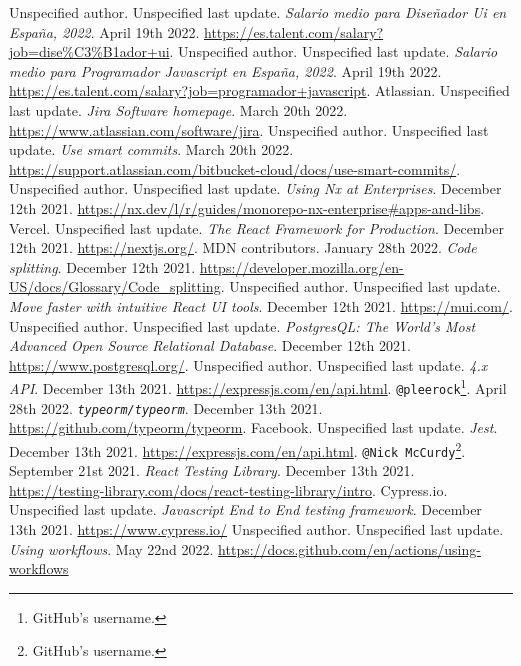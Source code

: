 \documentclass[a4paper, 12pt, oneside]{book}
\begin{document}
\begin{thebibliography}{9}
	Unspecified author. Unspecified last update. \emph{Salario medio para Diseñador Ui en España, 2022}. April 19th 2022. \url{https://es.talent.com/salary?job=dise%C3%B1ador+ui}.
	Unspecified author. Unspecified last update. \emph{Salario medio para Programador Javascript en España, 2022}. April 19th 2022. \url{https://es.talent.com/salary?job=programador+javascript}.
	Atlassian. Unspecified last update. \emph{Jira Software homepage}. March 20th 2022. \url{https://www.atlassian.com/software/jira}.
	Unspecified author. Unspecified last update. \emph{Use smart commits}. March 20th 2022. \url{https://support.atlassian.com/bitbucket-cloud/docs/use-smart-commits/}.
	Unspecified author. Unspecified last update. \emph{Using Nx at Enterprises}. December 12th 2021. \url{https://nx.dev/l/r/guides/monorepo-nx-enterprise#apps-and-libs}.
	Vercel. Unspecified last update. \emph{The React Framework for Production}. December 12th 2021. \url{https://nextjs.org/}.
	MDN contributors. January 28th 2022. \emph{Code splitting}. December 12th 2021. \url{https://developer.mozilla.org/en-US/docs/Glossary/Code_splitting}.
	Unspecified author. Unspecified last update. \emph{Move faster with intuitive React UI tools}. December 12th 2021. \url{https://mui.com/}.
	Unspecified author. Unspecified last update. \emph{PostgresQL: The World's Most Advanced Open Source Relational Database}. December 12th 2021. \url{https://www.postgresql.org/}.
	Unspecified author. Unspecified last update. \emph{4.x API}. December 13th 2021. \url{https://expressjs.com/en/api.html}.
	\texttt{@pleerock}\footnote{GitHub's username.}. April 28th 2022. \emph{\texttt{typeorm/typeorm}}. December 13th 2021. \url{https://github.com/typeorm/typeorm}.
	Facebook. Unspecified last update. \emph{Jest}. December 13th 2021. \url{https://expressjs.com/en/api.html}.
	\texttt{@Nick McCurdy}\footnote{GitHub's username.}. September 21st 2021. \emph{React Testing Library}. December 13th 2021. \url{https://testing-library.com/docs/react-testing-library/intro}.
	Cypress.io. Unspecified last update. \emph{Javascript End to End testing framework}. December 13th 2021. \url{https://www.cypress.io/}
	Unspecified author. Unspecified last update. \emph{Using workflows}. May 22nd 2022. \url{https://docs.github.com/en/actions/using-workflows}
\end{thebibliography}
\end{document}
